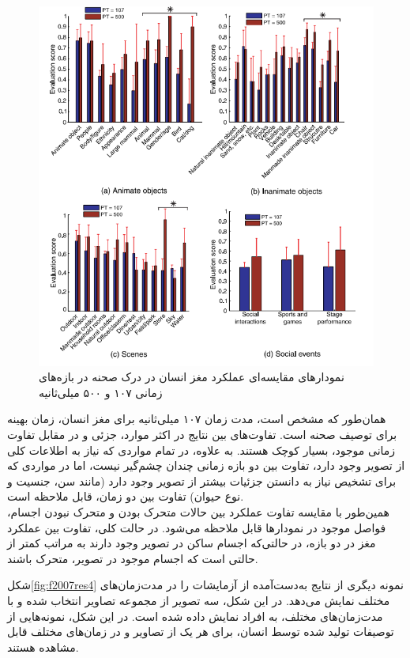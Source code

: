 \begin{enumerate}
	
	\begin{figure}[h]
		\center
		\includegraphics[scale=0.6]{./Imgs/fei2007we_res3.png}
		\caption[نمودار مقایسه‌ای عملکرد مغز در درک صحنه]{نمودارهای مقایسه‌ای عملکرد مغز انسان در درک صحنه در بازه‌های زمانی ۱۰۷ و ۵۰۰ میلی‌ثانیه\cite{fei2007we}}
		\label{fig:f2007res3}
	\end{figure}
	
	همان‌طور که مشخص است، مدت زمان ۱۰۷ میلی‌ثانیه برای مغز انسان، زمان بهینه برای توصیف صحنه است. تفاوت‌های بین نتایج در اکثر موارد، جزئی و در مقابل تفاوت زمانی موجود، بسیار کوچک هستند.
	به علاوه، در تمام مواردی که نیاز به اطلاعات کلی از تصویر وجود دارد، تفاوت بین دو بازه زمانی چندان چشم‌گیر نیست، اما در مواردی که برای تشخیص نیاز به دانستن جزئیات بیشتر از تصویر وجود دارد (مانند سن، جنسیت و نوع حیوان) تفاوت بین دو زمان، قابل ملاحظه است.
	\\
	همین‌طور با مقایسه تفاوت عملکرد بین حالات متحرک بودن و متحرک نبودن اجسام، فواصل موجود در نمودارها قابل ملاحظه می‌شود. در حالت کلی، تفاوت بین عملکرد مغز در دو بازه، در حالتی‌که اجسام ساکن در تصویر وجود دارند به مراتب کمتر از حالتی است که اجسام موجود در تصویر، متحرک باشند.
\end{enumerate}

شکل\ref{fig:f2007res4} نمونه دیگری از نتایج به‌دست‌آمده از آزمایشات را در مدت‌زمان‌های مختلف نمایش ‌می‌دهد. در این شکل، سه تصویر از مجموعه تصاویر انتخاب شده و با مدت‌زمان‌های مختلف، به افراد نمایش داده شده است. در این شکل، نمونه‌هایی از توصیفات تولید شده توسط انسان، برای هر یک از تصاویر و در زمان‌های مختلف قابل مشاهده هستند.



